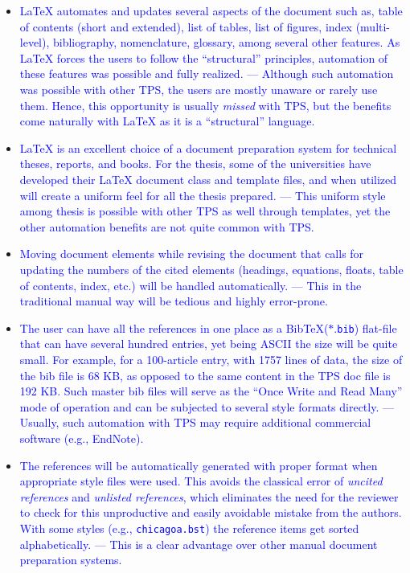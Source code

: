 \documentclass[phd,showgrids]{ndsu-thesis-2022}
\newcommand\italk[1]{\textcolor{blue}{#1}}  %
\newcommand\lx{\LaTeX\xspace}
\newcommand\bx{Bib\!\TeX\xspace}
\newcommand\vb[1]{\textcolor{blue}{\texttt{#1}}}%
\begin{document}
\begin{itemize}[leftmargin=*, itemsep=0pt, parsep=3pt]
\item \italk{\lx automates and updates several aspects of the document such as, table of contents (short and extended), list of tables, list of figures, index (multi-level), bibliography, nomenclature, glossary, among several other features. As \lx forces the users to follow the ``structural'' principles, automation of these features was possible and fully realized. --- Although such automation was possible with other TPS, the users are mostly unaware or rarely use them. Hence, this opportunity is usually \emph{missed} with TPS, but the benefits come naturally with \lx as it is a ``structural'' language.}

\item \italk{\lx is an excellent choice of a document preparation system for technical theses, reports, and books.  For the thesis, some of the universities have developed their \lx document class and template files, and when utilized will create a uniform feel for all the thesis prepared. --- This uniform style among thesis is possible with other TPS as well through templates, yet the other automation benefits are not quite common with TPS.}  

\item \italk{Moving document elements while revising the document that calls for updating the numbers of the cited elements (headings, equations, floats, table of contents, index, etc.) will be handled automatically. --- This in the traditional manual way will be tedious and highly error-prone.}   

\item \italk{The user can have all the references in one place as a \bx  ($\ast$.\vb{bib}) flat-file that can have several hundred entries, yet being ASCII the size will be quite small. For example, for a 100-article entry, with 1757 lines of data, the size of the bib file is 68 KB, as opposed to the same content in the TPS doc file is 192 KB. Such master bib files will serve as the ``Once Write and Read Many'' mode of operation and can be subjected to several style formats directly. --- Usually, such automation with TPS may require additional commercial software (e.g., EndNote).} 

\item \italk{The references will be automatically generated with proper format when appropriate style files were used. This avoids the classical error of \emph{uncited references} and \emph{unlisted references}, which eliminates the need for the reviewer to check for this unproductive and easily avoidable mistake from the authors.  With some styles (e.g., \vb{chicagoa.bst}) the reference items get sorted alphabetically. --- This is a clear advantage over other manual document preparation systems.}   


\end{itemize}
\end{document}
